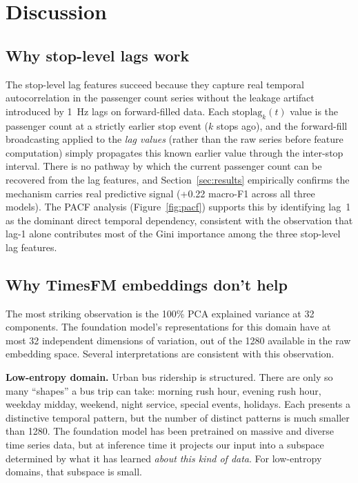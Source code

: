 \section{Discussion}
\label{sec:discussion}

\subsection{Why stop-level lags work}

The stop-level lag features succeed because they capture real temporal
autocorrelation in the passenger count series without the leakage artifact
introduced by 1~Hz lags on forward-filled data. Each
$\text{stoplag}_k(t)$ value is the passenger count at a strictly earlier
stop event ($k$ stops ago), and the forward-fill broadcasting applied to
the \emph{lag values} (rather than the raw series before feature
computation) simply propagates this known earlier value through the
inter-stop interval. There is no pathway by which the current passenger
count can be recovered from the lag features, and Section~\ref{sec:results}
empirically confirms the mechanism carries real predictive signal (+0.22
macro-F1 across all three models). The PACF analysis (Figure~\ref{fig:pacf})
supports this by identifying lag~1 as the dominant direct temporal
dependency, consistent with the observation that lag-1 alone contributes
most of the Gini importance among the three stop-level lag features.

\subsection{Why TimesFM embeddings don't help}

The most striking observation is the 100\% PCA explained variance at 32
components. The foundation model's representations for this domain have at
most 32 independent dimensions of variation, out of the 1280 available in
the raw embedding space. Several interpretations are consistent with this
observation.

\textbf{Low-entropy domain.} Urban bus ridership is structured. There are
only so many ``shapes'' a bus trip can take: morning rush hour, evening
rush hour, weekday midday, weekend, night service, special events,
holidays. Each presents a distinctive temporal pattern, but the number of
distinct patterns is much smaller than 1280. The foundation model has been
pretrained on massive and diverse time series data, but at inference time
it projects our input into a subspace determined by what it has learned
\emph{about this kind of data}. For low-entropy domains, that subspace is
small.


